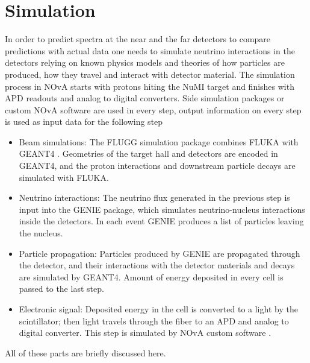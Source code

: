 \chapter{Simulation}
\label{simulation_chapter}

In order to predict spectra at the near and the far detectors to compare predictions with
actual data one needs to simulate neutrino interactions in the detectors relying on
known physics models and theories of how particles are produced, how they travel and interact
with detector material. The simulation process in NOvA starts with protons hiting
the NuMI target and finishes with APD readouts and analog to digital converters. Side simulation
packages or custom NOvA software are used in every step, output information on every step is
used as input data for the following step
\begin{itemize}
\item Beam simulations: The FLUGG simulation package combines FLUKA \cite{FLUKA} with GEANT4 \cite{GEANT4}.
Geometries of the target hall and detectors are encoded in GEANT4, and the proton interactions
and downstream particle decays are simulated with FLUKA.
\item Neutrino interactions: The neutrino flux generated in the previous step is input into
the GENIE \cite{GENIE} package, which simulates neutrino-nucleus interactions inside the
detectors. In each event GENIE produces a list of particles leaving the nucleus.
\item Particle propagation: Particles produced by GENIE are propagated through the detector,
and their interactions with the detector materials and decays are simulated by GEANT4. Amount of
energy deposited in every cell is passed to the last step.
\item Electronic signal: Deposited energy in the cell is converted to a light by the scintillator;
then light travels through the fiber to an APD and analog to digital converter. This step is
simulated by NOvA custom software \cite{NovaSim}.
\end{itemize}
All of these parts are briefly discussed here.


